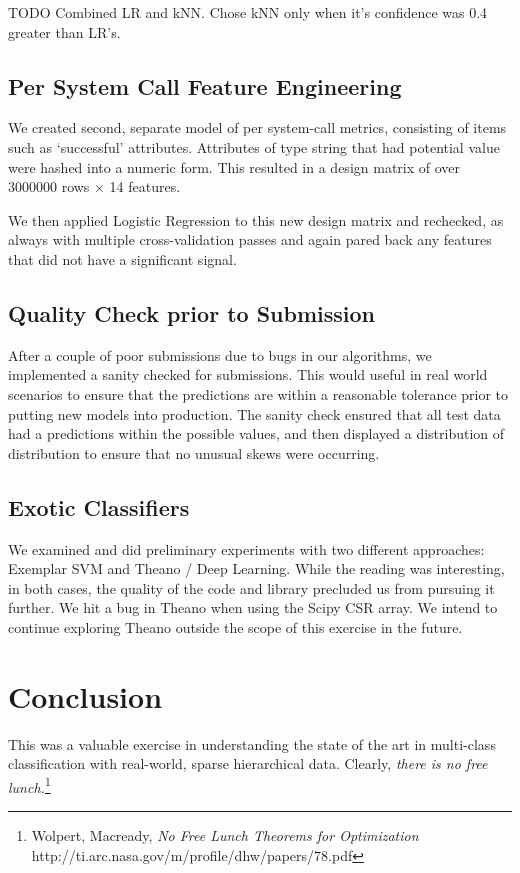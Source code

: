 \documentclass[11pt, oneside]{article}   	%
\begin{document}
TODO
Combined LR and kNN. Chose kNN only when it's confidence was 0.4 greater than LR's.


\subsection*{Per System Call Feature Engineering}

We created second, separate model of per system-call metrics, consisting of items such as `successful' attributes. Attributes of type string that had potential value were hashed into a numeric form. This resulted in a design matrix of over 
3000000 rows $\times$ 14 features.

We then applied Logistic Regression to this new design matrix and rechecked, as always with multiple cross-validation passes and again pared back any features that did not have a significant signal.

\subsection*{Quality Check prior to Submission}

After a couple of poor submissions due to bugs in our algorithms, we implemented a sanity checked for submissions. This would useful in real world scenarios to ensure that the predictions are within a reasonable tolerance prior to putting new models into production. The sanity check ensured that all test data had a predictions within the possible values, and then displayed a distribution of distribution to ensure that no unusual skews were occurring.

\subsection*{Exotic Classifiers}

We examined and did preliminary experiments with two different approaches: Exemplar SVM and Theano / Deep Learning. While the reading was interesting, in both cases, the quality of the code and library precluded us from pursuing it further. We hit a bug in Theano when using the Scipy CSR array. We intend to continue exploring Theano outside the scope of this exercise in the future.


\section*{Conclusion}

This was a valuable exercise in understanding the state of the art in multi-class classification with real-world, sparse hierarchical data. Clearly, \emph{there is no free lunch.}\footnote{Wolpert, Macready, \emph{No Free Lunch Theorems for Optimization} http://ti.arc.nasa.gov/m/profile/dhw/papers/78.pdf}
\end{document}
